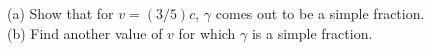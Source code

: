(a) Show that for $v=(3/5)c$, $\gamma$ comes out to be a simple fraction.\\
(b) Find another value of $v$ for which $\gamma$ is a simple fraction.
